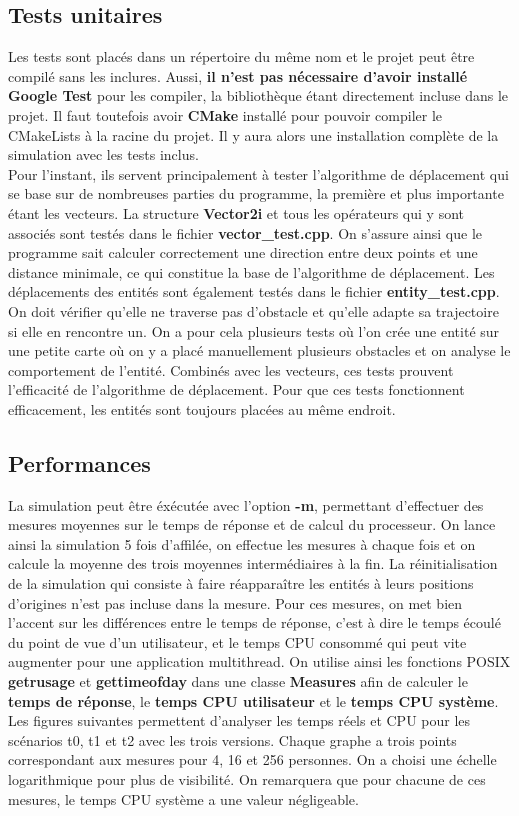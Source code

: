 \documentclass[11pt]{article} %
\begin{document}
\subsection{Tests unitaires}
Les tests sont placés dans un répertoire du même nom et le projet peut être compilé sans les inclures. Aussi, \textbf{il n'est pas nécessaire d'avoir installé Google Test} pour les compiler, la bibliothèque étant directement incluse dans le projet. Il faut toutefois avoir \textbf{CMake} installé pour pouvoir compiler le CMakeLists à la racine du projet. Il y aura alors une installation complète de la simulation avec les tests inclus. \\

Pour l'instant, ils servent principalement à tester l'algorithme de déplacement qui se base sur de nombreuses parties du programme, la première et plus importante étant les vecteurs. La structure \textbf{Vector2i} et tous les opérateurs qui y sont associés sont testés dans le fichier \textbf{vector\_test.cpp}. On s'assure ainsi que le programme sait calculer correctement une direction entre deux points et une distance minimale, ce qui constitue la base de l'algorithme de déplacement. 
Les déplacements des entités sont également testés dans le fichier \textbf{entity\_test.cpp}. On doit vérifier qu'elle ne traverse pas d'obstacle et qu'elle adapte sa trajectoire si elle en rencontre un. On a pour cela plusieurs tests où l'on crée une entité sur une petite carte où on y a placé manuellement plusieurs obstacles et on analyse le comportement de l'entité. Combinés avec les vecteurs, ces tests prouvent l'efficacité de l'algorithme de déplacement. Pour que ces tests fonctionnent efficacement, les entités sont toujours placées au même endroit.

\subsection{Performances}
La simulation peut être éxécutée avec l'option \textbf{-m}, permettant d'effectuer des mesures moyennes sur le temps de réponse et de calcul du processeur. On lance ainsi la simulation 5 fois d'affilée, on effectue les mesures à chaque fois et on calcule la moyenne des trois moyennes intermédiaires à la fin. La réinitialisation de la simulation qui consiste à faire réapparaître les entités à leurs positions d'origines n'est pas incluse dans la mesure. Pour ces mesures, on met bien l'accent sur les différences entre le temps de réponse, c'est à dire le temps écoulé du point de vue d'un utilisateur, et le temps CPU consommé qui peut vite augmenter pour une application multithread. On utilise ainsi les fonctions POSIX \textbf{getrusage} et \textbf{gettimeofday} dans une classe \textbf{Measures} afin de calculer le \textbf{temps de réponse}, le \textbf{temps CPU utilisateur} et le \textbf{temps CPU système}. Les figures suivantes permettent d'analyser les temps réels et CPU pour les scénarios t0, t1 et t2 avec les trois versions. Chaque graphe a trois points correspondant aux mesures pour 4, 16 et 256 personnes. On a choisi une échelle logarithmique pour plus de visibilité.
On remarquera que pour chacune de ces mesures, le temps CPU système a une valeur négligeable.
\end{document}
